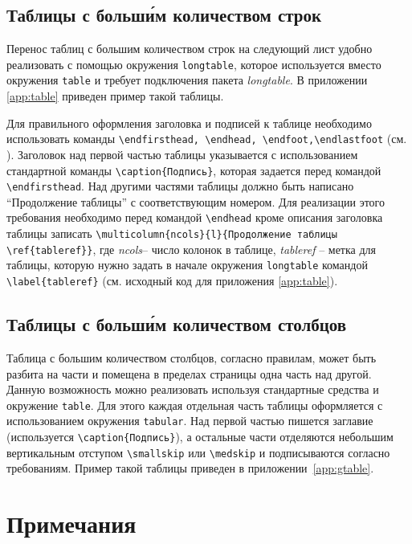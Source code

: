 \subsection{Таблицы с больш\'{и}м количеством строк}
\label{sec:ltable}

Перенос таблиц с большим количеством строк на следующий лист удобно реализовать
с помощью окружения \verb|longtable|, которое используется вместо окружения
\verb|table| и требует подключения пакета {\itshape longtable}. В приложении
\ref{app:table} приведен пример такой таблицы.

Для правильного оформления заголовка и подписей к таблице необходимо использовать команды \verb|\endfirsthead, \endhead, \endfoot,\endlastfoot| (см. \cite[раздел 12.5]{Kotelnikov}). Заголовок над первой частью таблицы указывается с использованием стандартной команды \verb|\caption{Подпись}|, которая задается перед командой \verb|\endfirsthead|. Над другими частями таблицы должно быть написано ``Продолжение таблицы'' с соответствующим номером. Для реализации этого требования необходимо перед командой \verb|\endhead| кроме описания заголовка таблицы записать \verb|\multicolumn{ncols}{l}{Продолжение таблицы \ref{tableref}}|, где {\itshape ncols}-- число колонок в таблице, {\itshape tableref} -- метка для таблицы, которую нужно задать в начале окружения \verb|longtable| командой \verb|\label{tableref}| (см. исходный код для приложения \ref{app:table}).

\subsection{Таблицы с больш\'{и}м количеством столбцов}
\label{sec:gtable}

Таблица с большим количеством столбцов, согласно правилам, может быть разбита на
части  и помещена в пределах страницы одна часть над другой. Данную возможность
можно реализовать используя стандартные средства \LaTeXe{}  и окружение
\verb|table|. Для этого каждая отдельная часть таблицы оформляется с
использованием окружения \verb|tabular|. Над первой частью пишется заглавие
(используется \verb|\caption{Подпись}|), а остальные части отделяются небольшим
вертикальным отступом \verb|\smallskip| или \verb|\medskip| и подписываются
согласно требованиям. Пример такой таблицы приведен в
приложении~\ref{app:gtable}.

\section{Примечания}

